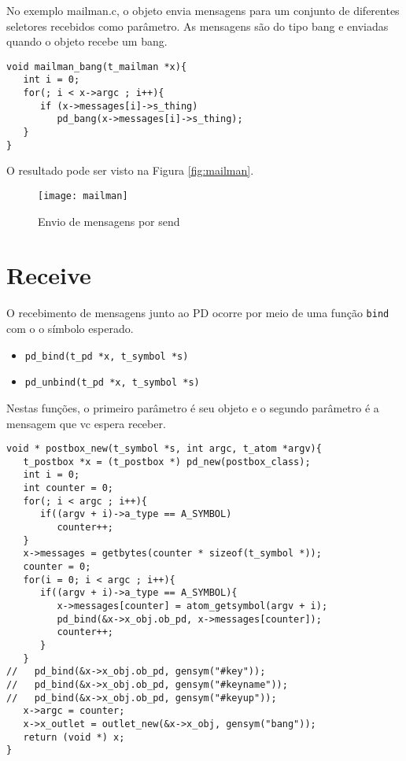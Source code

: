 No exemplo mailman.c, o objeto envia mensagens para um conjunto de diferentes 
seletores recebidos como parâmetro.
As mensagens são do tipo bang e enviadas quando o objeto recebe um bang.

\begin{lstlisting}[caption=Envio de mensagens bang por send]
void mailman_bang(t_mailman *x){
   int i = 0;
   for(; i < x->argc ; i++){
      if (x->messages[i]->s_thing)
         pd_bang(x->messages[i]->s_thing);
   }
}
\end{lstlisting}

O resultado pode ser visto na Figura \ref{fig:mailman}.
\begin{figure}[h!]
\centering
\texttt{[image: mailman]}
\caption{Envio de mensagens por send}
\end{figure}


\section{Receive}

O recebimento de mensagens junto ao PD ocorre por meio de uma função
\texttt{bind} com o o símbolo esperado.

\begin{itemize}
   \item \texttt{pd\_bind(t\_pd *x, t\_symbol *s)}
   \item \texttt{pd\_unbind(t\_pd *x, t\_symbol *s)}
\end{itemize}

Nestas funções, o primeiro parâmetro é seu objeto e o segundo parâmetro é a
mensagem que vc espera receber.

\begin{lstlisting}[caption=Exemplo de objeto que recebe várias mensagens]
void * postbox_new(t_symbol *s, int argc, t_atom *argv){
   t_postbox *x = (t_postbox *) pd_new(postbox_class);
   int i = 0;
   int counter = 0;
   for(; i < argc ; i++){
      if((argv + i)->a_type == A_SYMBOL)
         counter++;
   }
   x->messages = getbytes(counter * sizeof(t_symbol *));
   counter = 0;
   for(i = 0; i < argc ; i++){
      if((argv + i)->a_type == A_SYMBOL){
         x->messages[counter] = atom_getsymbol(argv + i);
         pd_bind(&x->x_obj.ob_pd, x->messages[counter]);
         counter++;
      }
   }
//   pd_bind(&x->x_obj.ob_pd, gensym("#key"));
//   pd_bind(&x->x_obj.ob_pd, gensym("#keyname"));
//   pd_bind(&x->x_obj.ob_pd, gensym("#keyup"));
   x->argc = counter;
   x->x_outlet = outlet_new(&x->x_obj, gensym("bang"));
   return (void *) x;
}
\end{lstlisting}


